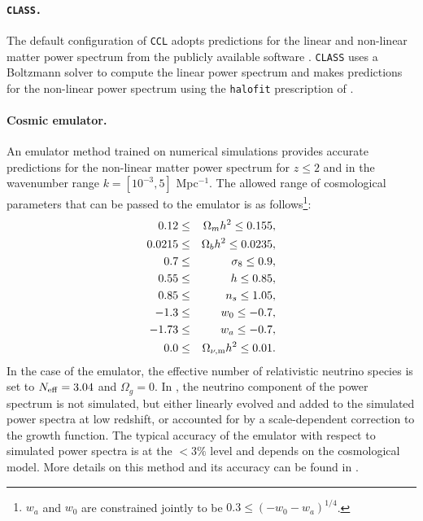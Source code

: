\documentclass[\docopts]{\docclass}
\newcommand{\ccl}{{\tt CCL}\xspace}
\newcommand{\halofit}{{\tt halofit}\xspace}
\newcommand{\class}{{\tt CLASS}\xspace}
\begin{document}
\paragraph{\bf \tt CLASS.} The default configuration of \ccl adopts predictions for the linear and non-linear matter power spectrum from the publicly available software \citep{class}. \class uses a Boltzmann solver to compute the linear power spectrum and makes predictions for the non-linear power spectrum using the \halofit prescription of \cite{CLASS_halofit}.

\paragraph{\bf Cosmic emulator.} An emulator method trained on numerical simulations \citep{Lawrence17} provides accurate predictions for the non-linear matter power spectrum for $z\leq 2$ and in the wavenumber range $k=[10^{-3},5]$ Mpc$^{-1}$. The allowed range of cosmological parameters that can be passed to the emulator is as follows\footnote{$w_a$ and $w_0$ are constrained jointly to be $0.3\leq (-w_0-w_a)^{1/4}$.}:
 \begin{eqnarray}
 0.12&\leq& \Omega_{m} h^2 \leq 0.155,\nonumber\\
 0.0215&\leq& \Omega_{b} h^2 \leq 0.0235,\nonumber\\
 0.7&\leq& \sigma_8 \leq 0.9,\nonumber\\
 0.55&\leq& h \leq 0.85,\nonumber\\
 0.85&\leq& n_s\leq 1.05,\nonumber\\
 -1.3&\leq& w_0\leq-0.7,\nonumber\\
 -1.73&\leq& w_a\leq -0.7,\nonumber\\
 0.0&\leq& \Omega_{\nu, {\rm m}} h^2 \leq 0.01.
 \end{eqnarray}
In the case of the emulator, the effective number of relativistic neutrino species is set to $N_{\rm eff}=3.04$ and $\Omega_g=0$. In \citet{Lawrence17}, the neutrino component of the power spectrum is not simulated, but either linearly evolved and added to the simulated power spectra at low redshift, or accounted for by a scale-dependent correction to the growth function. The typical accuracy of the emulator with respect to simulated power spectra is at the $<3\%$ level and depends on the cosmological model. More details on this method and its accuracy can be found in \citet{Upadhye14,Castorina15,Heitmann16}.
 
\end{document}

